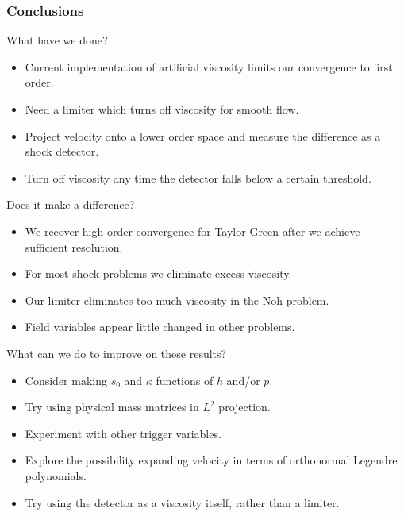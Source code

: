 \documentclass[8pt,xcolor=svgnames]{beamer}
\begin{document}

\begin{frame}\frametitle{Conclusions}
\begin{exampleblock}{What have we done?}
\begin{itemize}
\item Current implementation of artificial viscosity limits our convergence to first order.
\item Need a limiter which turns off viscosity for smooth flow.
\item Project velocity onto a lower order space and measure the difference as a shock detector.
\item Turn off viscosity any time the detector falls below a certain threshold.
\end{itemize}
\end{exampleblock}
\begin{exampleblock}{Does it make a difference?}
\begin{itemize}
\item We recover high order convergence for Taylor-Green after we achieve sufficient resolution.
\item For most shock problems we eliminate excess viscosity.
\item Our limiter eliminates too much viscosity in the Noh problem.
\item Field variables appear little changed in other problems.
\end{itemize}
\end{exampleblock}
\begin{exampleblock}{What can we do to improve on these results?}
\begin{itemize}
\item Consider making $s_0$ and $\kappa$ functions of $h$ and/or $p$.
\item Try using physical mass matrices in $L^2$ projection.
\item Experiment with other trigger variables.
\item Explore the possibility expanding velocity in terms of orthonormal Legendre polynomials.
\item Try using the detector as a viscosity itself, rather than a limiter.
\end{itemize}
\end{exampleblock}
\end{frame}


% 
% 
\end{document}
